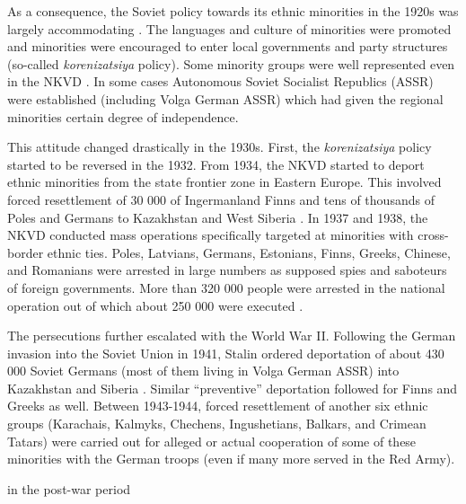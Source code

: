 As a consequence, the Soviet policy towards its ethnic minorities in the 1920s was largely accommodating \citep{martin_affirmative_2001}. The languages and culture of minorities were promoted and minorities were encouraged to enter local governments and party structures (so-called \emph{korenizatsiya} policy). Some minority groups were well represented even in the NKVD \citep[p. 25]{gregory_terror_2009}.
In some cases Autonomous Soviet Socialist Republics (ASSR) were established (including Volga German ASSR) which had given the regional minorities certain degree of independence. 

This attitude changed drastically in the 1930s.
First, the  \emph{korenizatsiya} policy started to be reversed in the 1932.
From 1934, the NKVD started to deport ethnic minorities from the state frontier zone in Eastern Europe. This involved forced resettlement of  30 000 of Ingermanland Finns and tens of thousands of Poles and Germans to  Kazakhstan and West Siberia  \citep[p. 95]{polian_against_2003}.
In 1937 and 1938, the NKVD conducted mass operations specifically
targeted at minorities with cross-border ethnic ties. 
Poles, Latvians, Germans, Estonians, Finns, Greeks, Chinese, and Romanians were arrested in large numbers as supposed spies and saboteurs of foreign governments.
More than 320 000 people were arrested in the national operation out of which about 250 000 were executed \citep[p. 855]{martin_origins_1998}. %

The persecutions  further escalated with the World War II. Following the German invasion into the Soviet Union in 1941, Stalin ordered deportation of about 430 000 Soviet Germans (most of them living in Volga German ASSR)  into Kazakhstan and Siberia \citep[p. 134]{polian_against_2003}. Similar \enquote{preventive} deportation followed for  Finns and Greeks as well. Between 1943-1944, forced resettlement of another six ethnic groups (Karachais, Kalmyks, Chechens, Ingushetians, Balkars, and Crimean Tatars) were carried out for alleged or actual cooperation of some of these minorities with the German troops (even if many more served in the Red Army). 

 in the post-war period
